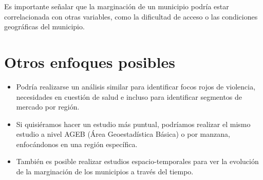 Es importante señalar que la marginación de un municipio podría estar correlacionada con otras variables, como la dificultad de acceso o las condiciones geográficas del municipio.

\section*{Otros enfoques posibles}
\begin{itemize}
\item Podría realizarse un análisis similar para identificar focos rojos de violencia, necesidades en cuestión de salud e incluso para identificar segmentos de mercado por región.
\item Si quisiéramos hacer un estudio más puntual, podríamos realizar el mismo estudio a nivel AGEB (Área Geoestadística Básica) o por manzana, enfocándonos en una región específica.
\item También es posible realizar estudios espacio-temporales para ver la evolución de la marginación de los municipios a través del tiempo.
\end{itemize}







